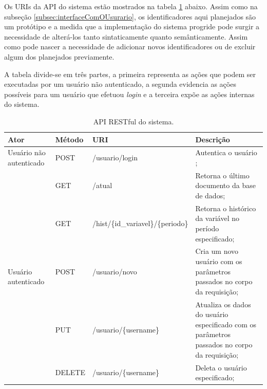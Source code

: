 Os URIs da API do sistema estão mostrados na tabela \ref{tab:api} abaixo. Assim como na subseção \ref{subsec:interfaceComOUsurario}, os identificadores aqui planejados são um protótipo e a medida que a implementação do sistema progride pode surgir a necessidade de alterá-los tanto sintaticamente quanto semânticamente. Assim como pode nascer a necessidade de adicionar novos identificadores ou de excluir algum dos planejados previamente.

A tabela divide-se em três partes, a primeira representa as ações que podem ser executadas por um usuário não autenticado, a segunda evidencia as ações possíveis para um usuário que efetuou \textit{login} e a terceira expõe as ações internas do sistema.

\newpage

\begin{table}[!h]
\huge
\centering
\caption{\label{tab:api} API RESTful do sistema.}
\begin{adjustbox}{max width=\textwidth}
\begin{tabular}{@{} p{8.5cm} | l l p{10cm} @{}}
\toprule
\multicolumn{1}{l}{Ator}                                 & Método & URI                                & Descrição                                                                                   \\ \hline
Usuário não autenticado              & POST   & /usuario/login                     & Autentica o usuário                                                                        ; \\ \hline
\multirow{5}{*}{Usuário autenticado} & GET    & /atual                             & Retorna o último documento da base de dados;                                                 \\ \cline{2-4}
                                     & GET    & /hist/\{id\_variavel\}/\{periodo\} & Retorna o histórico da variável no período especificado;                                     \\ \cline{2-4}
                                     & POST   & /usuario/novo                      & Cria um novo usuário com os parâmetros passados no corpo da requisição;                      \\ \cline{2-4}
                                     & PUT    & /usuario/\{username\}              & Atualiza os dados do usuário especificado com os parâmetros passados no corpo da requisição; \\ \cline{2-4}
                                     & DELETE & /usuario/\{username\}              & Deleta o usuário especificado;                                                               \\ \hline

\end{tabular}
\end{adjustbox}
\end{table}
